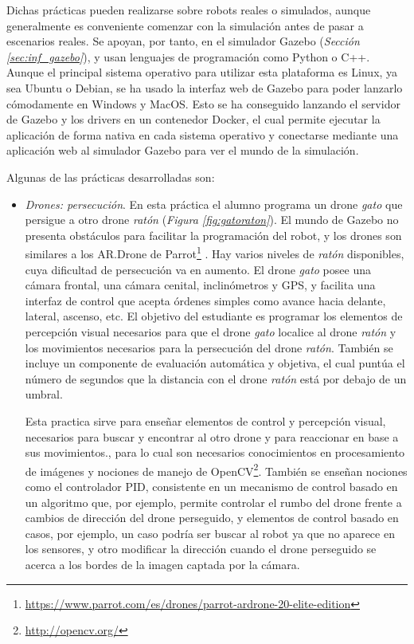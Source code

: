 Dichas prácticas pueden realizarse sobre robots reales o simulados, aunque generalmente es conveniente comenzar con la simulación antes de pasar a escenarios reales. Se apoyan, por tanto, en el simulador Gazebo (\textit{Sección \ref{sec:inf_gazebo}}), y usan lenguajes de programación como Python o C++. Aunque el principal sistema operativo para utilizar esta plataforma es Linux, ya sea Ubuntu o Debian, se ha usado la interfaz web de Gazebo para poder lanzarlo cómodamente en Windows y MacOS. Esto se ha conseguido lanzando el servidor de Gazebo y los drivers en un contenedor Docker, el cual permite ejecutar la aplicación de forma nativa en cada sistema operativo y conectarse mediante una aplicación web al simulador Gazebo para ver el mundo de la simulación.

Algunas de las prácticas desarrolladas son:
\begin{itemize}
	\item \textit{Drones: persecución}. En esta práctica el alumno programa un drone \textit{gato} que persigue a otro drone \textit{ratón} (\textit{Figura \ref{fig:gatoraton}}). El mundo de Gazebo no presenta obstáculos para facilitar la programación del robot, y los drones son similares a los AR.Drone de Parrot\footnote{\url{https://www.parrot.com/es/drones/parrot-ardrone-20-elite-edition}} . Hay varios niveles de \textit{ratón} disponibles, cuya dificultad de persecución va en aumento. El drone \textit{gato} posee una cámara frontal, una cámara cenital, inclinómetros y GPS, y facilita una interfaz de control que acepta órdenes simples como avance hacia delante, lateral, ascenso, etc. El objetivo del estudiante es programar los elementos de percepción visual necesarios para que el drone \textit{gato} localice al drone \textit{ratón} y los movimientos necesarios para la persecución del drone \textit{ratón}. También se incluye un componente de evaluación automática y objetiva, el cual puntúa el número de segundos que la distancia con el drone \textit{ratón} está por debajo de un umbral.
	
	Esta practica sirve para enseñar elementos de control y percepción visual, necesarios para buscar y encontrar al otro drone y para reaccionar en base a sus movimientos., para lo cual son necesarios conocimientos en procesamiento de imágenes y nociones de manejo de OpenCV\footnote{\url{http://opencv.org/}}. También se enseñan nociones como el controlador PID, consistente en un mecanismo de control basado en un algoritmo que, por ejemplo, permite controlar el rumbo del drone frente a cambios de dirección del drone perseguido, y elementos de control basado en casos, por ejemplo, un caso podría ser buscar al robot ya que no aparece en los sensores, y otro modificar la dirección cuando el drone perseguido se acerca a los bordes de la imagen captada por la cámara.


\end{itemize}

